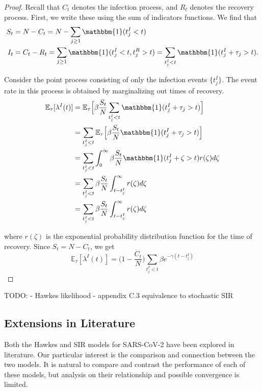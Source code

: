 \documentclass[12pt]{article}
\begin{document}
\begin{proof} Recall that $C_t$ denotes the infection process, and $R_t$ denotes the recovery process. First, we write these using the sum of indicators functions. We find that
\begin{align*}
S_t &= N - C_t = N - \sum_{j\geq 1} \mathbbm{1} (t_j^I < t) \\
I_t &= C_t - R_t = \sum_{j\geq 1} \mathbbm{1} (t_j^I < t, t_j^R > t) = \sum_{t_j^I < t} \mathbbm{1} (t_j^I + \tau_j > t). 
\end{align*} 
 
Consider the point process consisting of only the infection events $\{t_j^I\}$. The event rate in this process is obtained by marginalizing out times of recovery. 
\begin{align*}
\mathbb{E}_\tau [ \lambda^I (t)] 
&= \mathbb{E}_\tau \Big [\beta \frac{S_t}{N} \sum_{t_j^I < t} \mathbbm{1} (t_j^I + \tau_j > t) \Big ]\\ 
&= \sum_{t_j^I < t} \mathbb{E}_\tau \Big [\beta \frac{S_t}{N}  \mathbbm{1} (t_j^I + \tau_j > t) \Big ]\\
&= \sum_{t_j^I < t}\int_0^\infty \beta \frac{S_t}{N}  \mathbbm{1} (t_j^I + \zeta > t) r(\zeta) d\zeta \\
&= \sum_{t_j^I < t} \beta \frac{S_t}{N} \int_{t - t_j^I}^\infty r(\zeta) d\zeta \\
&= \sum_{t_j^I < t} \beta \frac{S_t}{N} \int_{t - t_j^I}^\infty r(\zeta) d\zeta
\end{align*}
 
where $r(\zeta)$ is the exponential probability distribution function for the time of recovery. Since $S_t = N - C_t$, we get
$$
\mathbb{E}_\tau [ \lambda^I (t)] = \Big (1 - \frac{C_t}{N} \Big ) \sum_{t_j^I < t}  \beta e^{- \gamma (t - t_j^I)}
$$ 
 
 
 
\end{proof}






TODO: 
- Hawkes likelihood
- appendix C.3 equivalence to stochastic SIR


\subsection{Extensions in Literature}

Both the Hawkes and SIR models for SARS-CoV-2 have been explored in literature. Our particular interest is the comparison and connection between the two models. It is natural to compare and contrast the performance of each of these models, but analysis on their relationship and possible convergence is limited. 
\end{document}
